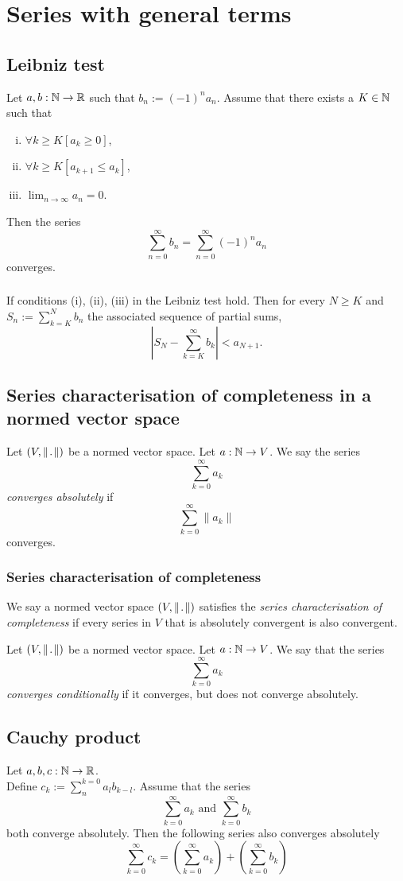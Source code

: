 \section{Series with general terms}


\subsection{Leibniz test}
\uthm Let $a,b : \mathbb{N} \to \mathbb{R}$ such that $b_n := (-1)^n a_n$.
Assume that there exists a $K \in \mathbb{N}$ such that
\begin{enumerate}[(i)]
    \item $\forall k \geq K \left[ a_k \geq 0 \right]$,
    \item $\forall k \geq K \left[ a_{k+1} \leq a_k \right]$,
    \item $\lim_{n \to \infty} a_n = 0$.
\end{enumerate}
Then the series 
\[
    \sum_{n=0}^{\infty} b_n = \sum_{n=0}^{\infty} (-1)^n a_n
\]
converges.

\subsubsection*{}
\uprop If conditions (i), (ii), (iii) in the Leibniz test hold.
Then for every $N \geq K$ and $S_n := \sum_{k=K}^{N} b_n$ the associated
sequence of partial sums,
\[
    \left| S_N - \sum_{k=K}^{\infty} b_k \right| < a_{N + 1}.
\]


\subsection{Series characterisation of completeness in a normed vector space}
\udef Let $(V, \norm)$ be a normed vector space. Let $a : \mathbb{N} \to V$.
We say the series
\[
    \sum_{k=0}^{\infty} a_k
\]
\emph{converges absolutely} if
\[
    \sum_{k=0}^{\infty} \| a_k \|
\]
converges.

\subsubsection*{Series characterisation of completeness}
\udef We say a normed vector space $(V, \norm)$ satisfies the
\emph{series characterisation of completeness} if every series in $V$
that is absolutely convergent is also convergent.

\udef Let $(V, \norm)$ be a normed vector space. Let $a : \mathbb{N} \to V$.
We say that the series
\[
    \sum_{k=0}^{\infty} a_k
\]
\emph{converges conditionally} if it converges, but does not converge absolutely.


\subsection{Cauchy product}
\uthm Let $a, b, c : \mathbb{N} \to \mathbb{R}$.\\
Define $c_k := \sum_{n}^{k=0} a_l b_{k-l}$.
Assume that the series
\[
    \sum_{k=0}^{\infty} a_k \text{ and }
    \sum_{k=0}^{\infty} b_k
\]
both converge absolutely. Then the following series also converges absolutely
\[
    \sum_{k=0}^{\infty} c_k = \left( \sum_{k=0}^{\infty} a_k \right)
        + \left( \sum_{k=0}^{\infty} b_k \right)
\]